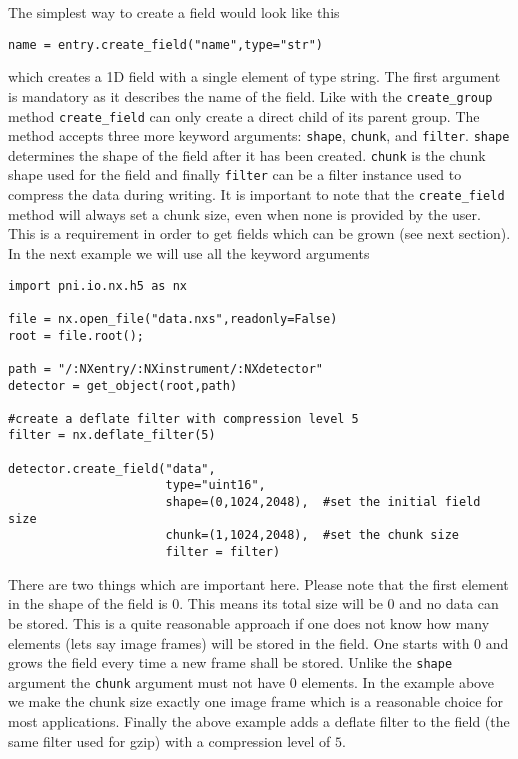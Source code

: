The simplest way to create a field would look like this
\begin{verbatim}
name = entry.create_field("name",type="str")
\end{verbatim}
which creates a 1D field with a single element of type string. The first
argument is mandatory as it describes the name of the field.
Like with the {\tt create\_group} method {\tt create\_field} can only create
a direct child of its parent group. The method accepts three more keyword 
arguments: {\tt shape}, {\tt chunk}, and {\tt filter}. 
{\tt shape} determines the shape of the field after it has been created. 
{\tt chunk} is the chunk shape used for the field and finally {\tt filter} 
can be a filter instance used to compress the data during writing. 
It is important to note that the {\tt create\_field} method will always set a
chunk size, even when none is provided by the user. This is a requirement 
in order to get fields which can be grown (see next section). 
In the next example we will use all the keyword arguments
\begin{verbatim}
import pni.io.nx.h5 as nx

file = nx.open_file("data.nxs",readonly=False)
root = file.root();

path = "/:NXentry/:NXinstrument/:NXdetector"
detector = get_object(root,path)

#create a deflate filter with compression level 5
filter = nx.deflate_filter(5)

detector.create_field("data",
                      type="uint16",
                      shape=(0,1024,2048),  #set the initial field size
                      chunk=(1,1024,2048),  #set the chunk size
                      filter = filter)
\end{verbatim}
There are two things which are important here. Please note that the first
element in the shape of the field is $0$. This means its total size will be $0$
and no data can be stored. This is a quite reasonable approach if one does not 
know how many elements (lets say image frames) will be stored in the field. 
One starts with $0$ and grows the field every time a new frame shall be stored. 
Unlike the {\tt shape} argument the {\tt chunk} argument must not have $0$
elements. In the example above we make the chunk size exactly one image frame
which is a reasonable choice for most applications. 
Finally the above example adds a deflate filter to the field (the same filter
used for gzip) with a compression level of $5$. 

